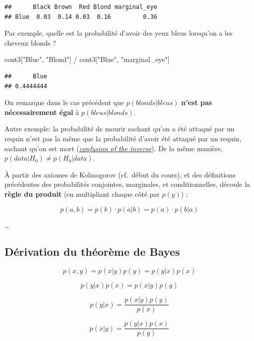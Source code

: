 \documentclass[
  a4paper,11pt,twoside,onecolumn,openright,final,oldfontcommands]{memoir}
\newenvironment{Shaded}{\begin{snugshade}}{\end{snugshade}}
\newcommand{\NormalTok}[1]{#1}
\newcommand{\SpecialCharTok}[1]{\textcolor[rgb]{0.00,0.00,0.00}{#1}}
\newcommand{\StringTok}[1]{\textcolor[rgb]{0.31,0.60,0.02}{#1}}
\theoremstyle{definition}
\theoremstyle{definition}
\theoremstyle{definition}
\theoremstyle{remark}
\begin{document}
\begin{verbatim}
##      Black Brown  Red Blond marginal_eye
## Blue  0.03  0.14 0.03  0.16         0.36
\end{verbatim}

Par exemple, quelle est la probabilité d'avoir des yeux bleus lorsqu'on a les cheveux blonds ?

\begin{Shaded}
\begin{Highlighting}[]
\NormalTok{cont3[}\StringTok{"Blue"}\NormalTok{, }\StringTok{"Blond"}\NormalTok{] }\SpecialCharTok{/}\NormalTok{ cont3[}\StringTok{"Blue"}\NormalTok{, }\StringTok{"marginal\_eye"}\NormalTok{]  }
\end{Highlighting}
\end{Shaded}

\begin{verbatim}
##      Blue 
## 0.4444444
\end{verbatim}

On remarque dans le cas précédent que \(p(blonds|bleus)\) \textbf{n'est pas nécessairement égal} à \(p(bleus|blonds)\).

Autre exemple: la probabilité de mourir sachant qu'on a été attaqué par un requin n'est pas la même que la probabilité d'avoir été attaqué par un requin, sachant qu'on est mort (\href{https://en.wikipedia.org/wiki/Confusion_of_the_inverse}{\emph{confusion of the inverse}}). De la même manière, \(p(data|H_{0}) \neq p(H_{0}|data)\).

À partir des axiomes de Kolmogorov (cf.~début du cours), et des définitions précédentes des probabilités conjointes, marginales, et conditionnelles, découle la \textbf{règle du produit} (en multipliant chaque côté par \(p(y)\)) :

\[p(a, b) = p(b) \cdot p(a|b) = p(a) \cdot p(b|a)\]

\ldots{}

\hypertarget{duxe9rivation-du-thuxe9oruxe8me-de-bayes}{%
\subsection{Dérivation du théorème de Bayes}\label{duxe9rivation-du-thuxe9oruxe8me-de-bayes}}

\[p(x, y) = p(x|y) p(y) = p(y|x)p(x)\]

\[p(y|x)p(x) = p(x|y)p(y)\]

\[p(y|x) = \dfrac{p(x|y)p(y)}{p(x)}\]

\[p(x|y) = \dfrac{p(y|x)p(x)}{p(y)}\]
\end{document}
